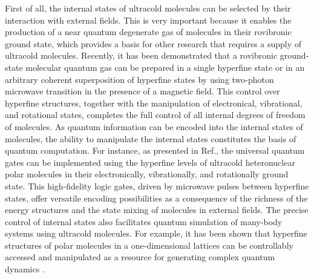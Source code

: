 First of all, the internal states of ultracold molecules can be selected by their interaction with  
external fields. This is very important because it enables the production of a near quantum degenerate gas of 
molecules in their rovibronic ground state\cite{ni2008, danzl2010}, which provides a basis for other research that 
requires a supply of  ultracold molecules. 
Recently, it has been demonstrated that a rovibronic ground-state molecular quantum gas  can be prepared in a single 
hyperfine state or in an arbitrary coherent superposition of hyperfine states\cite{ospelkaus2010} by using two-photon
microwave transition in the presence of a magnetic field. This control over hyperfine structures, together with the 
manipulation of electronical, vibrational, and rotational states, completes the full control of all internal degrees of
freedom of molecules. As quantum information can be encoded 
into the internal states of molecules,  the ability to manipulate the internal states constitutes the basis of 
quantum computation. For instance, as presented in Ref.\cite{pellegrini2011}, the universal quantum gates can be 
implemented using the hyperfine levels of ultracold 
heteronuclear polar molecules in their electronically, vibrationally, and rotationally ground state. This high-fidelity 
logic gates, driven by microwave pulses between hyperfine states, offer versatile encoding possibilities as a 
consequence of the richness of the energy structures and the state mixing of molecules in external fields. The precise control of internal states also 
facilitates quantum simulation of many-body systems using ultracold molecules. For example, it has been shown that hyperfine structures of polar molecules in a one-dimensional 
lattices can be controllably accessed and manipulated as a resource for generating complex quantum dynamics
\cite{Carr2}.  

